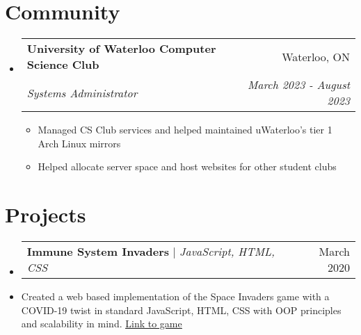 \documentclass[letterpaper,11pt]{article}
\makeatletter
\newcommand{\resumeItem}[1]{
  \item\small{
    {#1 \vspace{-2pt}}
  }
}
\newcommand{\resumeSubheading}[4]{
  \vspace{-2pt}\item
    \begin{tabular*}{0.97\textwidth}[t]{l@{\extracolsep{\fill}}r}
      \textbf{#1} & #2 \\
      \textit{\small#3} & \textit{\small #4} \\
    \end{tabular*}\vspace{-7pt}
}
\newcommand{\resumeProjectHeading}[2]{
    \item
    \begin{tabular*}{0.97\textwidth}{l@{\extracolsep{\fill}}r}
      \small#1 & #2 \\
    \end{tabular*}\vspace{-7pt}
}
\newcommand{\resumeSubHeadingListStart}{\begin{itemize}[leftmargin=0.15in, label={}]}
\newcommand{\resumeSubHeadingListEnd}{\end{itemize}}
\newcommand{\resumeItemListStart}{\begin{itemize}}
\newcommand{\resumeItemListEnd}{\end{itemize}\vspace{-5pt}}
\makeatother
\begin{document}

\section{Community}
    \resumeSubHeadingListStart

    \resumeSubheading
      {University of Waterloo Computer Science Club}{Waterloo, ON}
      {Systems Administrator} {March 2023 - August 2023}
      \resumeItemListStart
        \resumeItem{Managed CS Club services and helped maintained uWaterloo's tier 1 Arch Linux mirrors}
        \resumeItem{Helped allocate server space and host websites for other student clubs}
      \resumeItemListEnd
    
    \resumeSubHeadingListEnd



    
\section{Projects}
    \resumeSubHeadingListStart
    \resumeProjectHeading
          {\textbf{Immune System Invaders} $|$ \emph{JavaScript, HTML, CSS}}{March 2020}
          \item
          Created a web based implementation of the Space Invaders game with a COVID-19 twist in standard JavaScript, HTML, CSS with OOP principles and scalability in mind.
      \href{https://jiafengyu.github.io/ISI/game.html}{\underline{Link to game}}
    \resumeSubHeadingListEnd

%
\end{document}
